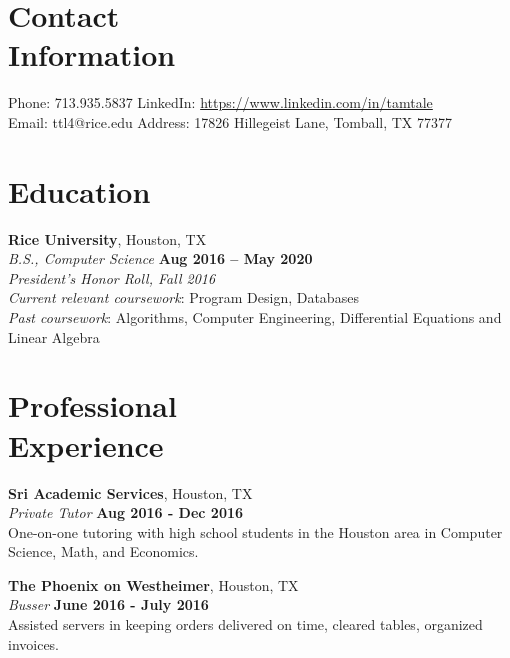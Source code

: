 \documentclass[margin,line]{resume}
\begin{document}
\begin{resume}
    \section{\mysidestyle Contact\\Information}

    Phone: 713.935.5837       \hfill LinkedIn: \url{https://www.linkedin.com/in/tamtale
} \\
    \noindent Email: ttl4@rice.edu  \hfill
    Address: 17826 Hillegeist Lane, Tomball, TX 77377

    \section{\mysidestyle Education}

    \textbf{Rice University}, Houston, TX \vspace{1mm}\\
    \textsl{B.S., Computer Science} \hfill \textbf{Aug 2016 -- May 2020} \vspace{1mm}\\
    \textsl{President's Honor Roll, Fall 2016} \vspace{1mm} \\
    \textsl{Current relevant coursework}: Program Design, Databases\\
    \textsl{Past coursework}: Algorithms, Computer Engineering, Differential Equations and Linear Algebra

    \section{\mysidestyle Professional\\Experience}

    \textbf{Sri Academic Services}, Houston, TX \vspace{2mm}\\\vspace{1mm}%
    \textsl{Private Tutor} \hfill \textbf{Aug 2016 - Dec 2016}\\
    One-on-one tutoring with high school students in the Houston area in Computer Science, Math, and Economics.

    \textbf{The Phoenix on Westheimer}, Houston, TX \vspace{2mm}\\\vspace{1mm}%
    \textsl{Busser} \hfill \textbf{June 2016 - July 2016}\\
    Assisted servers in keeping orders delivered on time, cleared tables, organized invoices.


\end{resume}
\end{document}
